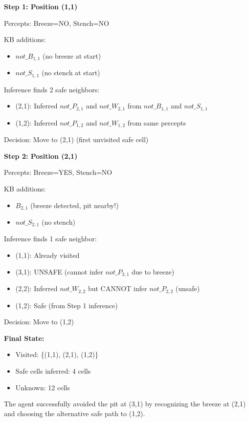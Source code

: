 \documentclass[letterpaper]{article}
\begin{document}
\textbf{Step 1: Position (1,1)}

Percepts: Breeze=NO, Stench=NO

KB additions:
\begin{itemize}
\item $not\_B_{1,1}$ (no breeze at start)
\item $not\_S_{1,1}$ (no stench at start)
\end{itemize}

Inference finds 2 safe neighbors:
\begin{itemize}
\item (2,1): Inferred $not\_P_{2,1}$ and $not\_W_{2,1}$ from $not\_B_{1,1}$ and $not\_S_{1,1}$
\item (1,2): Inferred $not\_P_{1,2}$ and $not\_W_{1,2}$ from same percepts
\end{itemize}

Decision: Move to (2,1) (first unvisited safe cell)

\textbf{Step 2: Position (2,1)}

Percepts: Breeze=YES, Stench=NO

KB additions:
\begin{itemize}
\item $B_{2,1}$ (breeze detected, pit nearby!)
\item $not\_S_{2,1}$ (no stench)
\end{itemize}

Inference finds 1 safe neighbor:
\begin{itemize}
\item (1,1): Already visited
\item (3,1): UNSAFE (cannot infer $not\_P_{3,1}$ due to breeze)
\item (2,2): Inferred $not\_W_{2,2}$ but CANNOT infer $not\_P_{2,2}$ (unsafe)
\item (1,2): Safe (from Step 1 inference)
\end{itemize}

Decision: Move to (1,2)

\textbf{Final State:}
\begin{itemize}
\item Visited: \{(1,1), (2,1), (1,2)\}
\item Safe cells inferred: 4 cells
\item Unknown: 12 cells
\end{itemize}

The agent successfully avoided the pit at (3,1) by recognizing the breeze at (2,1) and choosing the alternative safe path to (1,2).
\end{document}
